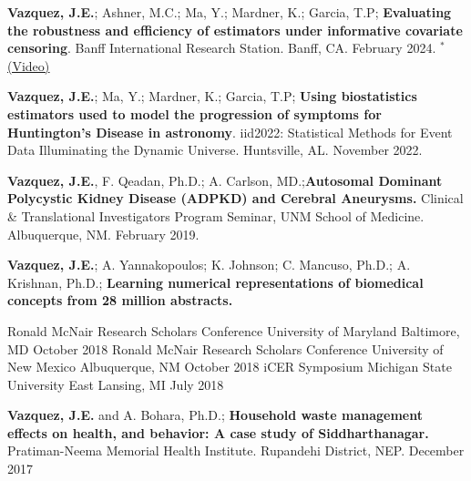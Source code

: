 \begin{cventries}
{{\begin{etaremune}
    \item {\bf Vazquez, J.E.}; Ashner, M.C.; Ma, Y.; Mardner, K.; Garcia, T.P; \textbf{Evaluating the robustness and efficiency of estimators under informative covariate censoring}. Banff International Research Station. Banff, CA. February 2024. $^*$ { 
\href{https://www.birs.ca/events/2024/5-day-workshops/24w5160/videos/watch/202402010930-Vazquez.html}{\underline{(Video)}}
}    
    
    \item {\bf Vazquez, J.E.}; Ma, Y.; Mardner, K.; Garcia, T.P; \textbf{Using biostatistics estimators used to model the progression of symptoms for Huntington's Disease in astronomy}. iid2022: Statistical Methods for Event Data Illuminating the Dynamic Universe. Huntsville, AL. November 2022.

    \item  {{\bf Vazquez, J.E.}, F. Qeadan, Ph.D.; A. Carlson, MD.;}\textbf{Autosomal Dominant Polycystic Kidney Disease (ADPKD) and Cerebral Aneurysms.} Clinical \& Translational Investigators Program Seminar, UNM School of Medicine. Albuquerque, NM. February 2019.
    
    \item {{\bf Vazquez, J.E.}; A. Yannakopoulos; K. Johnson; C. Mancuso, Ph.D.; A. Krishnan, Ph.D.; \textbf{Learning numerical representations of biomedical concepts from 28 million abstracts.}
    
    \begin{cvhonors_smaller}
      \cvhonor
        {Ronald McNair Research Scholars Conference}
        {University of Maryland}
        {Baltimore, MD} %
        {October 2018} %
      \cvhonor
        {Ronald McNair Research Scholars Conference}
        {University of New Mexico}
        {Albuquerque, NM} %
        {October 2018} %
      \cvhonor
        {iCER Symposium}
        {Michigan State University}
        {East Lansing, MI} %
        {July 2018} %
    \end{cvhonors_smaller}
    
    }
   
    \item {\bf Vazquez, J.E.} and A. Bohara, Ph.D.; \textbf{Household waste management effects on health, and behavior: A case study of Siddharthanagar.} Pratiman-Neema Memorial Health Institute. Rupandehi District, NEP. December 2017
    

\end{etaremune}}}
\end{cventries}
